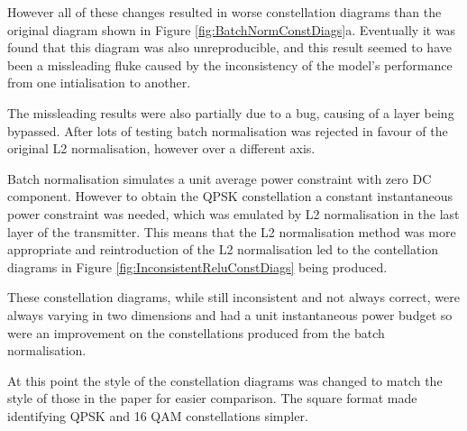 \documentclass[12pt,onecolumn,letterpaper]{article}
\begin{document}
However all of these changes resulted in worse constellation diagrams than the original diagram shown in Figure \ref{fig:BatchNormConstDiags}a. Eventually it was found that this diagram was also unreproducible, and this result seemed to have been a missleading fluke caused by the inconsistency of the model's performance from one intialisation to another.

The missleading results were also partially due to a bug, causing of a layer being bypassed. After lots of testing batch normalisation was rejected in favour of the original L2 normalisation, however over a different axis. 

Batch normalisation simulates a unit average power constraint with zero DC component. However to obtain the QPSK constellation a constant instantaneous power constraint was needed, which was emulated by L2 normalisation in the last layer of the transmitter. This means that the L2 normalisation method was more appropriate and reintroduction of the L2 normalisation led to the contellation diagrams in Figure \ref{fig:InconsistentReluConstDiags} being produced. 

These constellation diagrams, while still inconsistent and not always correct, were always varying in two dimensions and had a unit instantaneous power budget so were an improvement on the constellations produced from the batch normalisation.

At this point the style of the constellation diagrams was changed to match the style of those in the paper for easier comparison. The square format made identifying QPSK and 16 QAM constellations simpler.
   
\end{document}
